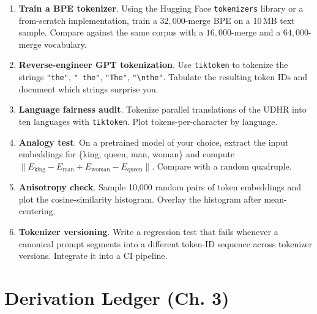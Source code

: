 \begin{enumerate}
  \item \textbf{Train a BPE tokenizer}. Using the Hugging Face
        \texttt{tokenizers} library or a from-scratch implementation,
        train a $32{,}000$-merge BPE on a 10\,MB text sample. Compare
        against the same corpus with a $16{,}000$-merge and a
        $64{,}000$-merge vocabulary.
  \item \textbf{Reverse-engineer GPT tokenization}. Use
        \texttt{tiktoken} to tokenize the strings \texttt{"the"},
        \texttt{" the"}, \texttt{"The"}, \texttt{"\textbackslash nthe"}.
        Tabulate the resulting token IDs and document which strings
        surprise you.
  \item \textbf{Language fairness audit}. Tokenize parallel
        translations of the UDHR into ten languages with
        \texttt{tiktoken}. Plot tokens-per-character by language.
  \item \textbf{Analogy test}. On a pretrained model of your choice,
        extract the input embeddings for \{king, queen, man, woman\}
        and compute $\|E_{\text{king}} - E_{\text{man}} +
        E_{\text{woman}} - E_{\text{queen}}\|$. Compare with a random
        quadruple.
  \item \textbf{Anisotropy check}. Sample 10{,}000 random pairs of
        token embeddings and plot the cosine-similarity histogram.
        Overlay the histogram after mean-centering.
  \item \textbf{Tokenizer versioning}. Write a regression test that
        fails whenever a canonical prompt segments into a different
        token-ID sequence across tokenizer versions. Integrate it
        into a CI pipeline.
\end{enumerate}

\section*{Derivation Ledger (Ch. 3)}

